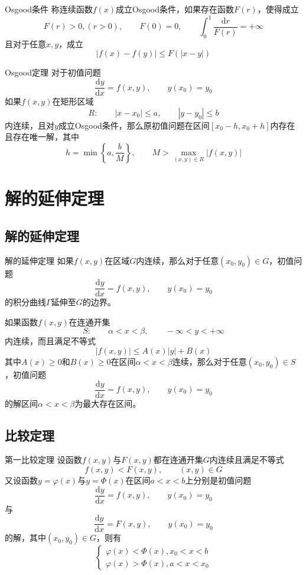 \documentclass[lang = cn, scheme = chinese, thmcnt = section]{elegantbook}
\newcommand{\dd}{\mathrm{d}}           %
\begin{document}
\begin{definition}{Osgood条件}
	称连续函数$f(x)$成立Osgood条件，如果存在函数$F(r)$，使得成立
	$$
	F(r)>0,(r>0),\qquad 
	F(0)=0,\qquad 
	\int_{0}^{1}\frac{\dd r}{F(r)}=+\infty
	$$
	且对于任意$x,y$，成立
	$$
	|f(x)-f(y)|\le F(|x-y|)
	$$
\end{definition}

\begin{theorem}{Osgood定理}
	对于初值问题
	$$
	\frac{\dd y}{\dd x}=f(x,y),\qquad 
	y(x_0)=y_0
	$$
	如果$f(x,y)$在矩形区域
	$$
	R:\qquad 
	|x-x_0|\le a,\qquad 
	|y-y_0|\le b
	$$
	内连续，且对$y$成立Osgood条件，那么原初值问题在区间$[x_0-h,x_0+h]$内存在且存在唯一解，其中
	$$
	h=\min{\left\{a,\frac{b}{M}\right\}},\qquad 
	M>\max_{(x,y)\in{R}}{|f(x,y)|}
	$$
\end{theorem}

\section{解的延伸定理}

\subsection{解的延伸定理}

\begin{theorem}{解的延伸定理}
	如果$f(x,y)$在区域$G$内连续，那么对于任意$(x_0,y_0)\in G$，初值问题
	$$
	\frac{\dd y}{\dd x}=f(x,y),\qquad 
	y(x_0)=y_0
	$$
	的积分曲线$\Gamma$延伸至$G$的边界。
\end{theorem}

\begin{theorem}
	如果函数$f(x,y)$在连通开集
	$$
	S:\qquad \alpha <x< \beta,\qquad -\infty <y< +\infty
	$$
	内连续，而且满足不等式
	$$
	|f(x,y)|\le A(x)|y|+B(x)
	$$
	其中$A(x)\ge 0$和$B(x)\ge 0$在区间$\alpha <x< \beta$连续，那么对于任意$(x_0,y_0)\in S$，初值问题
	$$
	\frac{\mathrm{d}y}{\mathrm{d}x}=f(x,y),\qquad 
	y(x_0)=y_0
	$$
	的解区间$\alpha <x< \beta$为最大存在区间。
\end{theorem}

\subsection{比较定理}

\begin{theorem}{第一比较定理}
	设函数$f(x,y)$与$F(x,y)$都在连通开集$G$内连续且满足不等式
	$$
	f(x,y)<F(x,y),\qquad (x,y)\in G
	$$
	又设函数$y=\varphi(x)$与$y=\Phi(x)$在区间$a<x<b$上分别是初值问题
	$$
	\frac{\mathrm{d}y}{\mathrm{d}x}=f(x,y),\qquad 
	y(x_0)=y_0
	$$
	与
	$$
	\frac{\mathrm{d}y}{\mathrm{d}x}=F(x,y),\qquad 
	y(x_0)=y_0
	$$
	的解，其中$(x_0,y_0)\in G$，则有
	$$
	\begin{cases}
		\varphi(x)<\Phi(x),x_0<x<b\\
		\varphi(x)>\Phi(x),a<x<x_0
	\end{cases}
	$$
\end{theorem}
\end{document}
